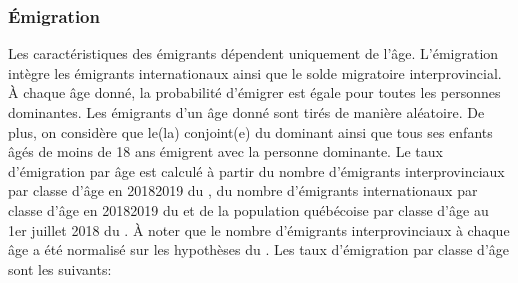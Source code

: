 \documentclass[letterpaper,10pt,french]{sphinxmanual}
\begin{document}
\subsubsection{Émigration}
\label{\detokenize{methodologie:emigration}}\label{\detokenize{methodologie:id13}}
Les caractéristiques des émigrants dépendent uniquement de l’âge. L’émigration intègre les émigrants internationaux ainsi que le solde migratoire interprovincial. À chaque âge donné, la probabilité d’émigrer est égale pour toutes les personnes dominantes. Les émigrants d’un âge donné sont tirés de manière aléatoire. De plus, on considère que le(la) conjoint(e) du dominant ainsi que tous ses enfants âgés de moins de 18 ans émigrent avec la personne dominante. Le taux d’émigration par âge est calculé à partir du nombre d’émigrants interprovinciaux par classe d’âge en 2018\sphinxhyphen{}2019 du , du nombre d’émigrants internationaux par classe d’âge en 2018\sphinxhyphen{}2019 du  et de la population québécoise par classe d’âge au 1er juillet 2018 du . À noter que le nombre d’émigrants interprovinciaux à chaque âge a été normalisé sur les hypothèses du . Les taux d’émigration par classe d’âge sont les suivants:
\end{document}
